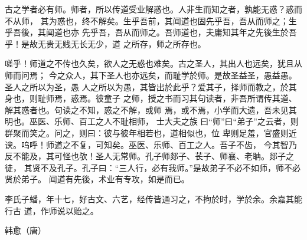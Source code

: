 古之学者必有师。师者，所以传道受业解惑也。人非生而知之者，孰能无惑？惑而不从师，
其为惑也，终不解矣。生乎吾前，其闻道也固先乎吾，吾从而师之；生乎吾後，其闻道也亦
先乎吾，吾从而师之。吾师道也，夫庸知其年之先後生於吾乎！是故无贵无贱无长无少，道
之所存，师之所存也。

嗟乎！师道之不传也久矣，欲人之无惑也难矣。古之圣人，其出人也远矣，犹且从师而问焉；
今之众人，其下圣人也亦远矣，而耻学於师。是故圣益圣，愚益愚。圣人之所以为圣，愚
人之所以为愚，其皆出於此乎？爱其子，择师而教之，於其身也，则耻师焉，惑焉。彼童子
之师，授之书而习其句读者，非吾所谓传其道、解其惑者也。句读之不知，惑之不解，或师
焉，或不焉，小学而大遗，吾未见其明也。巫医、乐师、百工之人不耻相师，  士大夫之族
曰“师”曰“弟子”之云者，则群聚而笑之。问之，则曰：彼与彼年相若也，道相似也，位
卑则足羞，官盛则近谀。呜呼！师道之不复，可知矣。巫医、乐师、百工之人。吾子不齿，
今其智乃反不能及，其可怪也欤！圣人无常师。孔子师郯子、苌子、师襄、老聃。郯子之徒，
其贤不及孔子。孔子曰：“三人行，必有我师。”是故弟子不必不如师，师不必贤於弟子。
闻道有先後，术业有专攻，如是而已。

李氏子蟠，年十七，好古文、六艺，经传皆通习之，不拘於时，学於余。余嘉其能行古
道，作师说以贻之。

\hfill \pozhehao 韩愈（唐）

